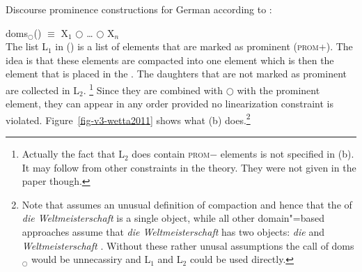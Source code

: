 \begin{exe}
\ex Discourse prominence constructions for German according to \citet[]{Wetta2011a}:
\begin{xlist}
\ex doms$_\bigcirc$() $\equiv$ X$_1$
$\bigcirc$ \ldots{} $\bigcirc$ X$_n$
\ex {} \impl\\
\zl
The list L$_1$ in () is a list of elements that are marked as prominent (\textsc{prom}+). The
idea is that these elements are compacted into one element which is then the element that is placed
in the \vf. The daughters that are not marked as prominent are collected in L$_2$.%
\footnote{
  Actually the fact that L$_2$ does contain \textsc{prom}$-$ elements is not specified in
  (b). It may follow from other constraints in the theory. They were not given in the paper though.
}
Since they are combined with $\bigcirc$ with the prominent element, they can appear in any order
provided no linearization constraint is violated.
Figure~\ref{fig-v3-wetta2011} shows what (b) does.\footnote{%
  Note that \citet[]{Wetta2011a} assumes an unusual definition of compaction and hence that the \domv of \emph{die Weltmeisterschaft} is a single object, while
  all other domain"=based approaches assume that \emph{die Weltmeisterschaft} has two \domain
  objects: \emph{die} and \emph{Weltmeisterschaft} \citep{KP95a,Kathol2001a,Babel,Mueller99a}. Without these rather unusal assumptions the call
  of doms$_\bigcirc$ would be unnecassiry and L$_1$ and L$_2$ could be used directly.
}
\begin{figure}
\oneline{%
\begin{forest}
sn edges
[{\ms{ d & \sliste{ \ms{ prom & \normalfont + \\
                          f    & \phonliste{ zum, zweiten, Mal, die Weltmeisterschaft } },
                     \ms{ f    & \phonliste{ errang } },
}}}
\end{forest}}
\end{figure}
\end{xlist}
\end{exe}
